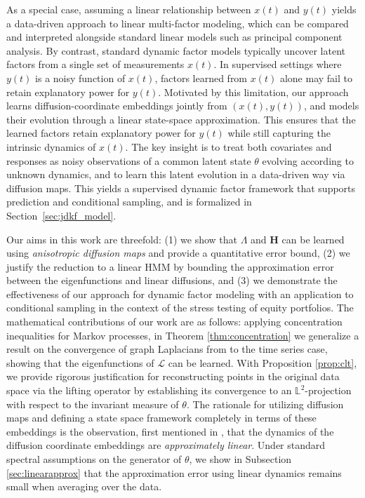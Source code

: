 \documentclass[11pt]{article}
\theoremstyle{plain}
\theoremstyle{definition}
\theoremstyle{remark}
\numberwithin{equation}{section}
\renewcommand{\L}{\mathscr{L}}
\begin{document}
As a special case, assuming a linear relationship between $x(t)$ and $y(t)$ yields a data-driven approach to linear multi-factor modeling, which can be compared and interpreted alongside standard linear models such as principal component analysis. By contrast, standard dynamic factor models typically uncover latent factors from a single set of measurements $x(t)$. In supervised settings where $y(t)$ is a noisy function of $x(t)$, factors learned from $x(t)$ alone may fail to retain explanatory power for $y(t)$. 
Motivated by this limitation, our approach learns diffusion-coordinate embeddings jointly from $(x(t),y(t))$, and models their evolution through a linear state-space approximation. This ensures that the learned factors retain explanatory power for $y(t)$ while still capturing the intrinsic dynamics of $x(t)$. The key insight is to treat both covariates and responses as noisy observations of a common latent state $\theta$ evolving according to unknown dynamics, and to learn this latent evolution in a data-driven way via diffusion maps. This yields a supervised dynamic factor framework that supports prediction and conditional sampling, and is formalized in Section~\ref{sec:jdkf_model}.

Our aims in this work are threefold: (1) we show that $\Lambda$ and $\mathbf{H}$ can be learned using \emph{anisotropic diffusion maps} and provide a quantitative error bound, (2) we justify the reduction to a linear HMM by bounding the approximation error between the eigenfunctions and linear diffusions, and (3) we demonstrate the effectiveness of our approach for dynamic factor modeling with an application to conditional sampling in the context of the stress testing of equity portfolios. 
The mathematical contributions of our work are as follows:
applying concentration inequalities for Markov processes, in Theorem \ref{thm:concentration} we generalize a result on the convergence of graph Laplacians from \citet{singer_graph_2006} to the time series case, showing that the eigenfunctions of $\L$ can be learned. 
With Proposition \ref{prop:clt}, we provide rigorous justification for reconstructing points in the original data space via the lifting operator by establishing its convergence to an $\mathbb{L}^2$-projection with respect to the invariant measure of $\theta$. The rationale for utilizing diffusion maps and defining a state space framework completely in terms of these embeddings is the observation, first mentioned in \citet{coifman2008diffusion}, that the dynamics of the diffusion coordinate embeddings are \textit{approximately linear}. Under standard spectral assumptions on the generator of $\theta$, we show in Subsection \ref{sec:linearapprox} that the approximation error using linear dynamics remains small when averaging over the data. 
\end{document}
